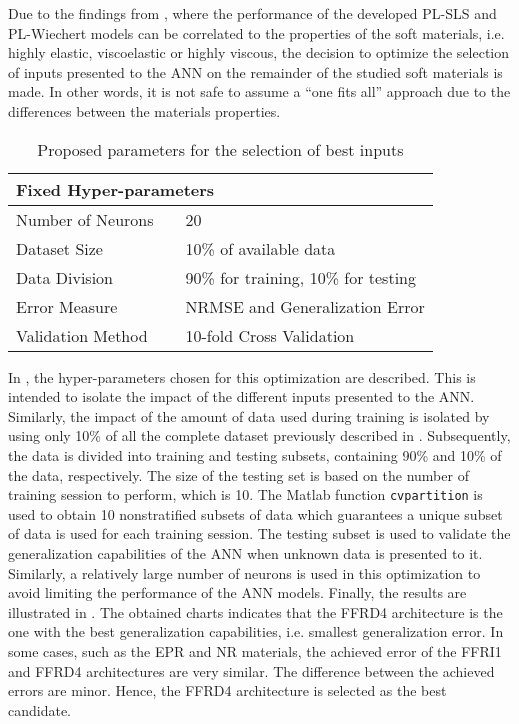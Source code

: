 Due to the findings from , where the performance of the developed PL-SLS and PL-Wiechert models can be correlated to the properties of the soft materials, i.e. highly elastic, viscoelastic or highly viscous, the decision to optimize the selection of inputs presented to the ANN on the remainder of the studied soft materials is made. In other words, it is not safe to assume a ``one fits all'' approach due to the differences between the materials properties. 

\begin{table}[htbp!]
    \centering
    \caption{Proposed parameters for the selection of best inputs}
    \begin{tabular}{l m{1cm} l}
    \toprule
    \multicolumn{3}{l}{Fixed Hyper-parameters} \\
    \hline
    Number of Neurons           & & 20 \\
    Dataset Size     			& & 10\% of available data\\
    Data Division               & & 90\% for training, 10\% for testing\\
    Error Measure               & & NRMSE and Generalization Error\\
    Validation Method           & & 10-fold Cross Validation\\
    \bottomrule
    \end{tabular}
    \label{tbl:ANN_InputSelParameters}
\end{table}

In , the hyper-parameters chosen for this optimization are described. This is intended to isolate the impact of the different inputs presented to the ANN. Similarly, the impact of the amount of data used during training is isolated by using only 10\% of all the complete dataset previously described in . Subsequently, the data is divided into training and testing subsets, containing 90\% and 10\% of the data, respectively. The size of the testing set is based on the number of training session to perform, which is 10. The Matlab function \texttt{cvpartition} is used to obtain 10 nonstratified subsets of data which guarantees a unique subset of data is used for each training session. The testing subset is used to validate the generalization capabilities of the ANN when unknown data is presented to it. Similarly, a relatively large number of neurons is used in this optimization to avoid limiting the performance of the ANN models. Finally, the results are illustrated in . The obtained charts indicates that the FFRD4 architecture is the one with the best generalization capabilities, i.e. smallest generalization error. In some cases, such as the EPR and NR materials, the achieved error of the FFRI1 and FFRD4 architectures are very similar. The difference between the achieved errors are minor. Hence, the FFRD4 architecture is selected as the best candidate.

